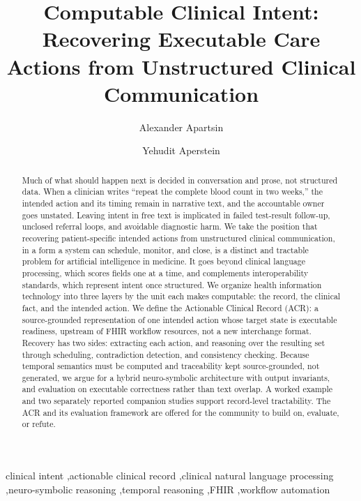 \documentclass[3p,twocolumn]{elsarticle}
\begin{document}
\begin{frontmatter}
\title{Computable Clinical Intent: Recovering Executable Care Actions from Unstructured Clinical Communication}

\author[hit]{Alexander Apartsin}
\author[afeka]{Yehudit Aperstein}

\begin{abstract}
Much of what should happen next is decided in conversation and prose, not structured data. When a clinician writes ``repeat the complete blood count in two weeks,'' the intended action and its timing remain in narrative text, and the accountable owner goes unstated. Leaving intent in free text is implicated in failed test-result follow-up, unclosed referral loops, and avoidable diagnostic harm. We take the position that recovering patient-specific intended actions from unstructured clinical communication, in a form a system can schedule, monitor, and close, is a distinct and tractable problem for artificial intelligence in medicine. It goes beyond clinical language processing, which scores fields one at a time, and complements interoperability standards, which represent intent once structured. We organize health information technology into three layers by the unit each makes computable: the record, the clinical fact, and the intended action. We define the Actionable Clinical Record (ACR): a source-grounded representation of one intended action whose target state is executable readiness, upstream of FHIR workflow resources, not a new interchange format. Recovery has two sides: extracting each action, and reasoning over the resulting set through scheduling, contradiction detection, and consistency checking. Because temporal semantics must be computed and traceability kept source-grounded, not generated, we argue for a hybrid neuro-symbolic architecture with output invariants, and evaluation on executable correctness rather than text overlap. A worked example and two separately reported companion studies support record-level tractability. The ACR and its evaluation framework are offered for the community to build on, evaluate, or refute.
\end{abstract}

\begin{keyword}
clinical intent \sep actionable clinical record \sep clinical natural language processing \sep neuro-symbolic reasoning \sep temporal reasoning \sep FHIR \sep workflow automation
\end{keyword}

\end{frontmatter}
\end{document}
